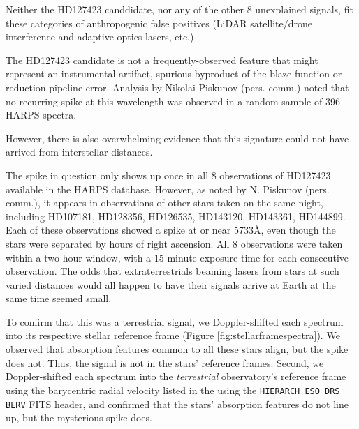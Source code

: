 \documentclass[linenumbers]{aastex631}
\begin{document}
Neither the HD127423 canddidate, nor any of the other 8 unexplained signals, fit these categories of anthropogenic false positives (LiDAR satellite/drone interference and adaptive optics lasers, etc.)

The HD127423 candidate is not a frequently-observed feature that might represent an instrumental artifact, spurious byproduct of the blaze function or reduction pipeline error. Analysis by Nikolai Piskunov (pers. comm.) noted that no recurring spike at this wavelength was observed in a random sample of 396 HARPS spectra. 

However, there is also overwhelming evidence that this signature could not have arrived from interstellar distances.  

The spike in question only shows up once in all 8 observations of HD127423 available in the HARPS database.  However, as noted by N. Piskunov (pers. comm.), it appears in observations of other stars taken on the same night, including HD107181, HD128356, HD126535, HD143120, HD143361, HD144899.  Each of these observations showed a spike at or near 5733\AA, even though the stars were separated by hours of right ascension. All 8 observations were taken within a two hour window, with a 15 minute exposure time for each consecutive observation. The odds that extraterrestrials beaming lasers from stars at such varied distances would all happen to have their signals arrive at Earth at the same time seemed small. 

To confirm that this was a terrestrial signal, we Doppler-shifted each spectrum into its respective stellar reference frame (Figure \ref{fig:stellarframespectra}).  We observed that absorption features common to all these stars align, but the spike does not. Thus, the signal is not in the stars' reference frames.  Second, we Doppler-shifted each spectrum into the {\em terrestrial} observatory's reference frame using the barycentric radial velocity listed in the using the \texttt{HIERARCH ESO DRS BERV} FITS header, and confirmed that the stars' absorption features do not line up, but the mysterious spike does.
\end{document}
